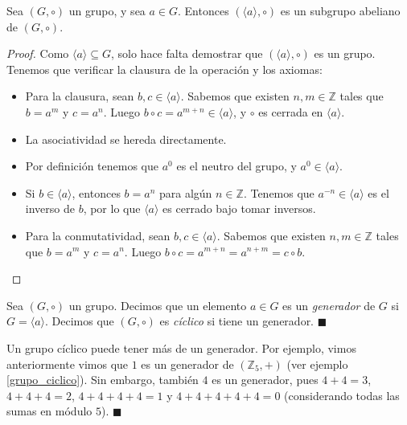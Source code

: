\begin{proposition}\label{prop-generado}
	Sea $(G,\circ)$ un grupo, y sea $a \in G$. Entonces $(\langle a\rangle , \circ)$ es un subgrupo abeliano de $(G,\circ)$. 
\end{proposition} 


\begin{proof}
Como $\langle a\rangle\subseteq G$, solo hace falta demostrar
que $(\langle a\rangle,\circ)$ es un grupo. Tenemos que verificar la clausura de la operación y los axiomas:
\begin{itemize}
\item Para la clausura, sean $b,c \in \langle
a\rangle$. Sabemos que existen $n, m \in \mathbb{Z}$ tales que $b = a^m$ y $c = a^n$. Luego $b \circ c = a^{m+n} \in \langle a\rangle$, y $\circ$ es cerrada en $\langle a \rangle$.
\item La asociatividad se hereda directamente.
\item Por definición tenemos que $a^0$ es el neutro del grupo, y $a^0 \in \langle a \rangle$. 
\item Si $b \in \langle a \rangle$, entonces $b = a^n$ para algún $n \in \mathbb{Z}$. Tenemos que $a^{-n} \in \langle a \rangle$ es el inverso de $b$, por lo que $\langle a \rangle$ es cerrado bajo tomar inversos.
\item Para la conmutatividad, sean $b,c \in \langle
	a\rangle$. Sabemos que existen $n, m \in \mathbb{Z}$ tales que $b = a^m$ y $c = a^n$. Luego $b \circ c = a^{m + n} = a^{n + m} = c \circ b$.
\end{itemize}
\end{proof}

\begin{definition} 
Sea $(G, \circ)$ un grupo. Decimos que un elemento $a \in G$ es un \emph{generador} de $G$ si $G = \langle a \rangle$. Decimos que $(G, \circ)$ es \emph{cíclico} si tiene un generador.
\hfill$\blacksquare$
\end{definition}

\begin{remark}
Un grupo cíclico puede tener más de un generador. Por ejemplo, vimos anteriormente vimos que $1$ es un generador de $(\mathbb{Z}_5, +)$ (ver ejemplo \ref{grupo_ciclico}). Sin embargo, también $4$ es un generador, pues $4 + 4 = 3$, $4 + 4 + 4 = 2$, $4 + 4 + 4 + 4 = 1$ y $4 + 4 + 4 + 4 + 4 = 0$ (considerando todas las sumas en módulo $5$).
\hfill$\blacksquare$
\end{remark}

